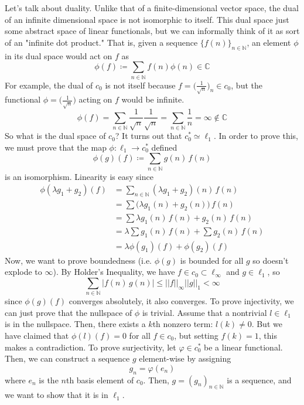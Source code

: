 \documentclass{article}
\theoremstyle{remark}
\theoremstyle{definition}
\begin{document}
Let's talk about duality. Unlike that of a finite-dimensional vector space, the dual of an infinite dimensional space is not isomorphic to itself. This dual space just some abstract space of linear functionals, but we can informally think of it as sort of an "infinite dot product." That is, given a sequence $\{ f(n) \}_{n \in \mathbb{N}}$, an element $\phi$ in its dual space would act on $f$ as 
\[\phi(f) \coloneqq \sum_{n \in \mathbb{N}} f(n) \phi(n) \in \mathbb{C}\]
For example, the dual of $c_0$ is not itself because $f = \big(\frac{1}{\sqrt{n}}\big)_n \in c_0$, but the functional $\phi = \big(\frac{1}{\sqrt{n}} \big)$ acting on $f$ would be infinite. 
\[\phi(f) = \sum_{n \in \mathbb{N}} \frac{1}{\sqrt{n}} \frac{1}{\sqrt{n}} = \sum_{n \in \mathbb{N}} \frac{1}{n} = \infty \not\in \mathbb{C}\]
So what is the dual space of $c_0$? It turns out that $c_0^* \simeq \ell_1$. In order to prove this, we must prove that the map $\phi: \ell_1 \longrightarrow c_0^*$ defined 
\[\phi(g) (f) \coloneqq \sum_{n \in \mathbb{N}} g(n) \, f(n)\]
is an isomorphism. Linearity is easy since 
\begin{align*}
    \phi(\lambda g_1 + g_2) (f) & = \sum_{n \in \mathbb{N}} (\lambda g_1 + g_2) (n) \, f(n) \\
    & = \sum \big( \lambda g_1 (n) + g_2 (n) \big) \, f(n) \\
    & = \sum \lambda g_1(n) \, f(n) + g_2 (n) \, f(n) \\
    & = \lambda \sum g_1(n) \, f(n) + \sum g_2(n) \, f(n) \\
    & = \lambda \phi(g_1) (f) + \phi (g_2) (f)
\end{align*}
Now, we want to prove boundedness (i.e. $\phi(g)$ is bounded for all $g$ so doesn't explode to $\infty$). By Holder's Inequality, we have $f \in c_0 \subset \ell_\infty$ and $g \in \ell_1$, so 
\[\sum_{n \in \mathbb{N}} |f(n) \, g(n)| \leq ||f||_\infty ||g||_1 < \infty\]
since $\phi(g)(f)$ converges absolutely, it also converges. To prove injectivity, we can just prove that the nullspace of $\phi$ is trivial. Assume that a nontrivial $l \in \ell_1$ is in the nullspace. Then, there exists a $k$th nonzero term: $l(k) \neq 0$. But we have claimed that $\phi(l)(f) = 0$ for all $f \in c_0$, but setting $f(k) = 1$, this makes a contradiction. To prove surjectivity, let $\varphi \in c_0^*$ be a linear functional. Then, we can construct a sequence $g$ element-wise by assigning 
\[g_n = \varphi(e_n)\]
where $e_n$ is the $n$th basis element of $c_0$. Then, $g = (g_n)_{n \in \mathbb{N}}$ is a sequence, and we want to show that it is in $\ell_1$. 
\end{document}
